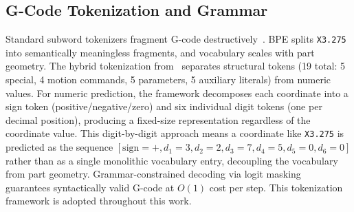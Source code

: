 \documentclass[sensors,article,submit,moreauthors,pdftex]{Definitions/mdpi}
\begin{document}
\begin{table}[H]
\centering
\caption{Comparison with related work involving G-code or sensor-based manufacturing models. No prior work reconstructs G-code from sensor data. Evaluation metrics differ across studies and are not directly comparable.}
\label{tab:lit_comparison}
\small
{}%
\normalsize
\end{table}

\subsection{G-Code Tokenization and Grammar}
\label{sec:related_grammar}

Standard subword tokenizers fragment G-code destructively~\cite{grammar_paper}. BPE splits \texttt{X3.275} into semantically meaningless fragments, and vocabulary scales with part geometry. The hybrid tokenization from~\cite{grammar_paper} separates structural tokens (19 total: 5 special, 4 motion commands, 5 parameters, 5 auxiliary literals) from numeric values. For numeric prediction, the framework decomposes each coordinate into a sign token (positive/negative/zero) and six individual digit tokens (one per decimal position), producing a fixed-size representation regardless of the coordinate value. This digit-by-digit approach means a coordinate like \texttt{X3.275} is predicted as the sequence $[\text{sign}{=}+, d_1{=}3, d_2{=}2, d_3{=}7, d_4{=}5, d_5{=}0, d_6{=}0]$ rather than as a single monolithic vocabulary entry, decoupling the vocabulary from part geometry. Grammar-constrained decoding via logit masking~\cite{picard,outlines,xgrammar} guarantees syntactically valid G-code at $O(1)$ cost per step. This tokenization framework is adopted throughout this work.
\end{document}
